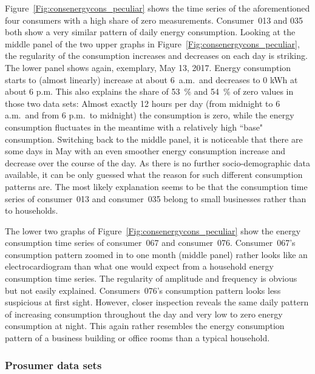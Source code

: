 Figure~\ref{Fig:consenergycons_peculiar} shows the time series of the aforementioned four consumers with a high share of zero measurements. Consumer~013 and 035 both show a very similar pattern of daily energy consumption. Looking at the middle panel of the two upper graphs in Figure~\ref{Fig:consenergycons_peculiar}, the regularity of the consumption increases and decreases on each day is striking. The lower panel shows again, exemplary, May 13, 2017. Energy consumption starts to (almost linearly) increase at about 6~a.m.~and decreases to 0 kWh at about 6 p.m. This also explains the share of 53~\% and 54~\% of zero values in those two data sets: Almost exactly 12 hours per day (from midnight to 6 a.m.~and from 6 p.m.~to midnight) the consumption is zero, while the energy consumption fluctuates in the meantime with a relatively high ``base" consumption. Switching back to the middle panel, it is noticeable that there are some days in May with an even smoother energy consumption increase and decrease over the course of the day. As there is no further socio-demographic data available, it can be only guessed what the reason for such different consumption patterns are. The most likely explanation seems to be that the consumption time series of consumer~013 and consumer~035 belong to small businesses rather than to households.

The lower two graphs of Figure~\ref{Fig:consenergycons_peculiar} show the energy consumption time series of consumer~067 and consumer~076. Consumer~067's consumption pattern zoomed in to one month (middle panel) rather looks like an electrocardiogram than what one would expect from a household energy consumption time series. The regularity of amplitude and frequency is obvious but not easily explained. Consumers~076's consumption pattern looks less suspicious at first sight. However, closer inspection reveals the same daily pattern of increasing consumption throughout the day and very low to zero energy consumption at night. This again rather resembles the energy consumption pattern of a business building or office rooms than a typical household.



\subsubsection{Prosumer data sets}

